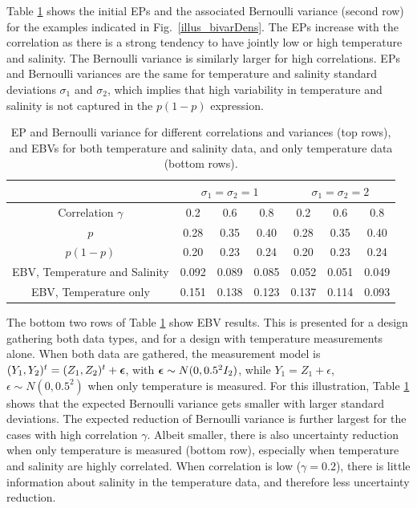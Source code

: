 \documentclass[aoas]{imsart}
\begin{document}
Table \ref{tab:sim_rhoab} shows the initial EPs and the associated
Bernoulli variance (second row) for the examples indicated in
Fig.~\ref{illus_bivarDens}. The EPs increase with the correlation as
there is a strong tendency to have jointly low or high temperature and
salinity. The Bernoulli variance is similarly larger for high
correlations. EPs and Bernoulli variances are the same for temperature
and salinity standard deviations $\sigma_1$ and $\sigma_2$, which
implies that high variability in temperature and salinity is not
captured in the $p(1-p)$ expression.

\begin{table}[!t] \centering \caption{EP and Bernoulli variance for
    different correlations and variances (top rows), and EBVs for both
    temperature and salinity data, and only temperature data (bottom
    rows).}
  \begin{tabular}{c|ccc|ccc}
 &\multicolumn{3}{c}{$\sigma_1=\sigma_2=1$} & \multicolumn{3}{c}{$\sigma_1=\sigma_2=2$} \\
\hline
Correlation $\gamma$ & 0.2 & 0.6 & 0.8 & 0.2 & 0.6 & 0.8 \\
\hline
$p$ & 0.28 & 0.35 & 0.40 & 0.28 & 0.35 & 0.40 \\ 
$p(1-p)$ & 0.20 & 0.23 & 0.24 & 0.20 & 0.23 & 0.24 \\ 
EBV, Temperature and Salinity & 0.092 & 0.089 & 0.085 & 0.052 & 0.051 & 0.049 \\ 
EBV, Temperature only & 0.151 & 0.138 & 0.123 & 0.137 & 0.114 & 0.093 \\ 
\hline
\end{tabular}
\label{tab:sim_rhoab}
\end{table}
The bottom two rows of Table \ref{tab:sim_rhoab} show EBV
results. This is presented for a design gathering both data types, and
for a design with temperature measurements alone. When both data are
gathered, the measurement model is
$(Y_1,Y_2)^t=(Z_1,Z_2)^t+{\boldsymbol \epsilon}$, with
${\boldsymbol \epsilon} \sim N(0,0.5^2I_2)$, while $Y_1=Z_1+\epsilon$,
$\epsilon \sim N(0,0.5^2)$ when only temperature is measured.  For
this illustration, Table \ref{tab:sim_rhoab} shows that the expected
Bernoulli variance gets smaller with larger standard deviations. The
expected reduction of Bernoulli variance is further largest for the
cases with high correlation $\gamma$. Albeit smaller, there is also
uncertainty reduction when only temperature is measured (bottom row),
especially when temperature and salinity are highly correlated. When
correlation is low ($\gamma=0.2$), there is little information about
salinity in the temperature data, and therefore less uncertainty
reduction.
\end{document}
